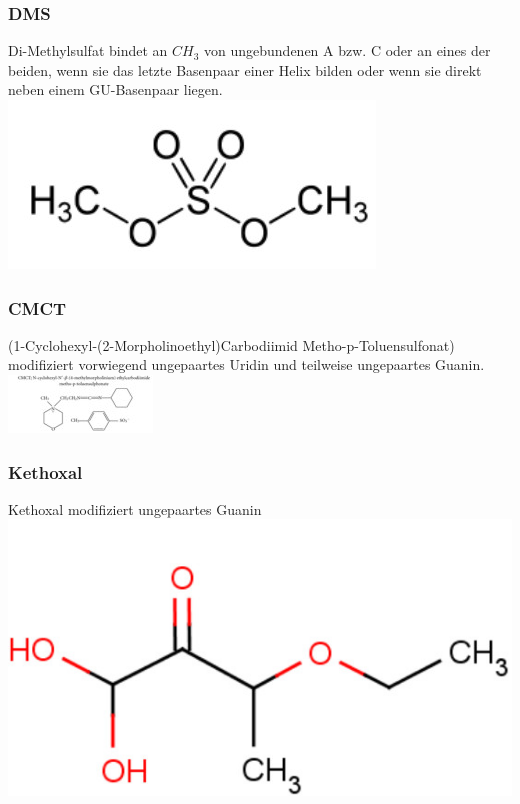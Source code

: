 \subsubsection{DMS}
Di-Methylsulfat bindet an $CH_3$ von ungebundenen A bzw. C oder an eines der beiden, wenn sie das letzte Basenpaar einer Helix bilden oder wenn sie direkt neben einem GU-Basenpaar liegen. \\
\includegraphics[scale=0.3]{lectures/160527/pix/Dimethylsulfat.jpg} \\

\subsubsection{CMCT}
(1-Cyclohexyl-(2-Morpholinoethyl)Carbodiimid Metho-p-Toluensulfonat) modifiziert vorwiegend ungepaartes Uridin und teilweise ungepaartes Guanin. \\
\includegraphics[scale=1]{lectures/160527/pix/CMCT.jpg} \\

\subsubsection{Kethoxal}
Kethoxal modifiziert ungepaartes Guanin \\
\includegraphics[scale=0.3]{lectures/160527/pix/Kethoxal.jpg}

